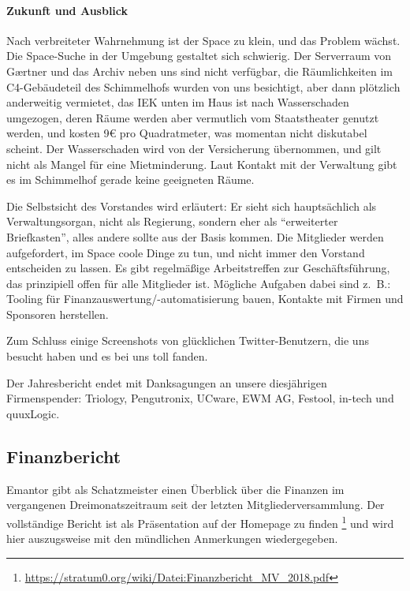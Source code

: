 \documentclass{s0minutes}
\begin{document}
\paragraph{Zukunft und Ausblick}

Nach verbreiteter Wahrnehmung ist der Space zu klein, und das Problem wächst.
Die Space-Suche in der Umgebung gestaltet sich schwierig. Der Serverraum von
G\ae{}rtner und das Archiv neben uns sind nicht verfügbar, die Räumlichkeiten im
C4-Gebäudeteil des Schimmelhofs wurden von uns besichtigt, aber dann plötzlich
anderweitig vermietet, das IEK unten im Haus ist nach Wasserschaden umgezogen,
deren Räume werden aber vermutlich vom Staatstheater genutzt werden, und kosten
9€ pro Quadratmeter, was momentan nicht diskutabel scheint. Der Wasserschaden
wird von der Versicherung übernommen, und gilt nicht als Mangel für eine
Mietminderung. Laut Kontakt mit der Verwaltung gibt es im Schimmelhof gerade
keine geeigneten Räume.

Die Selbstsicht des Vorstandes wird erläutert: Er sieht sich hauptsächlich als
Verwaltungsorgan, nicht als Regierung, sondern eher als "`erweiterter
Briefkasten"', alles andere sollte aus der Basis kommen.  Die Mitglieder werden
aufgefordert, im Space coole Dinge zu tun, und nicht immer den Vorstand
entscheiden zu lassen.  Es gibt regelmäßige Arbeitstreffen zur Geschäftsführung,
das prinzipiell offen für alle Mitglieder ist. Mögliche Aufgaben dabei sind
z.~B.: Tooling für Finanzauswertung/-automatisierung bauen, Kontakte mit Firmen
und Sponsoren herstellen.

Zum Schluss einige Screenshots von glücklichen Twitter-Benutzern, die uns
besucht haben und es bei uns toll fanden.

Der Jahresbericht endet mit Danksagungen an unsere diesjährigen Firmenspender:
Triology, Pengutronix, UCware, EWM AG, Festool, in-tech und quuxLogic.


\subsection{Finanzbericht}

Emantor gibt als Schatzmeister einen Überblick über die Finanzen im
vergangenen Dreimonatszeitraum seit der letzten Mitgliederversammlung. Der
vollständige Bericht ist als Präsentation auf der Homepage zu finden%
\footnote{\url{https://stratum0.org/wiki/Datei:Finanzbericht_MV_2018.pdf}}
und wird hier auszugsweise mit den mündlichen Anmerkungen wiedergegeben.
\end{document}
